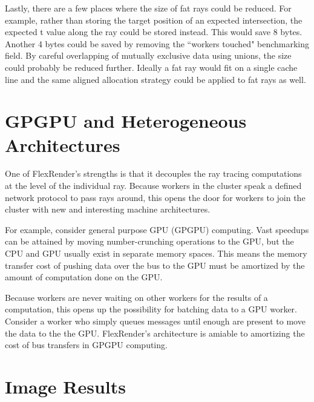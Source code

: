 \documentclass[12pt]{ucthesis}
\begin{document}
Lastly, there are a few places where the size of fat rays could be reduced.
For example, rather than storing the target position of an expected
intersection, the expected t value along the ray could be stored instead. This
would save 8 bytes. Another 4 bytes could be saved by removing the ``workers
touched" benchmarking field. By careful overlapping of mutually exclusive data
using unions, the size could probably be reduced further. Ideally a fat ray
would fit on a single cache line and the same aligned allocation strategy could
be applied to fat rays as well.

\section{GPGPU and Heterogeneous Architectures}
\label{hetergenous}

One of FlexRender's strengths is that it decouples the ray tracing computations
at the level of the individual ray. Because workers in the cluster speak a
defined network protocol to pass rays around, this opens the door for workers to
join the cluster with new and interesting machine architectures.

For example, consider general purpose GPU (GPGPU) computing. Vast speedups can
be attained by moving number-crunching operations to the GPU, but the CPU and
GPU usually exist in separate memory spaces. This means the memory transfer cost
of pushing data over the bus to the GPU must be amortized by the amount of
computation done on the GPU.

Because workers are never waiting on other workers for the results of a
computation, this opens up the possibility for batching data to a GPU worker.
Consider a worker who simply queues messages until enough are present to move
the data to the the GPU. FlexRender's architecture is amiable to amortizing
the cost of bus transfers in GPGPU computing.

\clearpage



\section*{Image Results}
\end{document}
